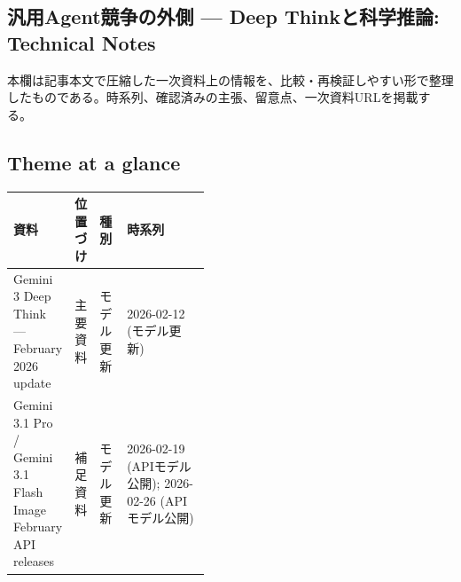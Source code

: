 \subsection*{汎用Agent競争の外側 — Deep Thinkと科学推論: Technical Notes}
本欄は記事本文で圧縮した一次資料上の情報を、比較・再検証しやすい形で整理したものである。時系列、確認済みの主張、留意点、一次資料URLを掲載する。
\medskip
\subsection*{Theme at a glance}
\begin{center}
\footnotesize
\begin{tabularx}{\linewidth}{@{}p{0.20\linewidth}p{0.10\linewidth}p{0.14\linewidth}X@{}}
\toprule
資料 & 位置づけ & 種別 & 時系列 \\
\midrule
Gemini 3 Deep Think — February 2026 update & 主要資料 & モデル更新 & 2026-02-12 (モデル更新) \\
Gemini 3.1 Pro / Gemini 3.1 Flash Image February API releases & 補足資料 & モデル更新 & 2026-02-19 (APIモデル公開); 2026-02-26 (APIモデル公開) \\
\bottomrule
\end{tabularx}
\end{center}
\normalsize

